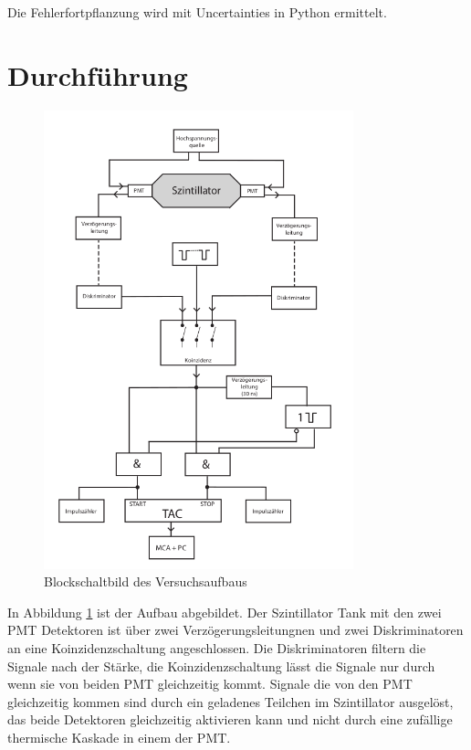 Die Fehlerfortpflanzung wird mit Uncertainties in Python \cite{uncertainties} ermittelt.


\section{Durchführung \cite{man}}

\begin{figure}
	\centering
	\includegraphics[width=0.8\textwidth]{./Bilder/aufbau.png}
	\caption{Blockschaltbild des Versuchsaufbaus}\label{fig:aufbau}
\end{figure}

In Abbildung \ref{fig:aufbau} ist der Aufbau abgebildet.
Der Szintillator Tank mit den zwei PMT Detektoren ist über zwei Verzögerungsleitungnen
und zwei Diskriminatoren an eine Koinzidenzschaltung angeschlossen. 
Die Diskriminatoren filtern die Signale nach der Stärke, die Koinzidenzschaltung
lässt die Signale nur durch wenn sie von beiden PMT gleichzeitig kommt.
Signale die von den PMT gleichzeitig kommen sind durch ein geladenes Teilchen im Szintillator
ausgelöst, das beide Detektoren gleichzeitig aktivieren kann und nicht durch eine zufällige 
thermische Kaskade in einem der PMT.

